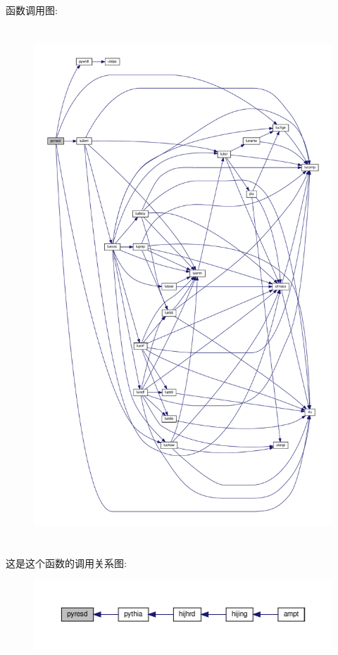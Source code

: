 函数调用图\+:
\nopagebreak
\begin{figure}[H]
\begin{center}
\leavevmode
\includegraphics[height=550pt]{pyresd_8f90_a72d4075dc223b982c0db0b46e3492e70_cgraph}
\end{center}
\end{figure}
这是这个函数的调用关系图\+:
\nopagebreak
\begin{figure}[H]
\begin{center}
\leavevmode
\includegraphics[width=350pt]{pyresd_8f90_a72d4075dc223b982c0db0b46e3492e70_icgraph}
\end{center}
\end{figure}
